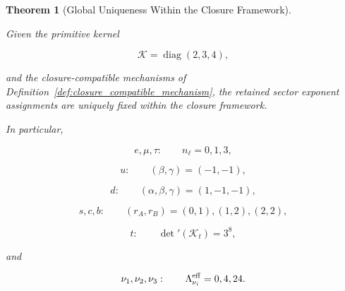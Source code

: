 \documentclass[11pt]{article}
\newtheorem{theorem}{Theorem}[section]
\theoremstyle{definition}
\theoremstyle{remark}
\begin{document}
\begin{theorem}[Global Uniqueness Within the Closure Framework]
\label{thm:global_uniqueness_within_closure_framework}

Given the primitive kernel

\begin{equation}
\mathcal K
=
\operatorname{diag}(2,3,4),
\end{equation}

and the closure-compatible mechanisms of
Definition~\ref{def:closure_compatible_mechanism}, the retained
sector exponent assignments are uniquely fixed within the
closure framework.

In particular,

\begin{equation}
e,\mu,\tau:
\qquad
n_\ell=0,1,3,
\end{equation}

\begin{equation}
u:
\qquad
(\beta,\gamma)=(-1,-1),
\end{equation}

\begin{equation}
d:
\qquad
(\alpha,\beta,\gamma)=(1,-1,-1),
\end{equation}

\begin{equation}
s,c,b:
\qquad
(r_A,r_B)=(0,1),(1,2),(2,2),
\end{equation}

\begin{equation}
t:
\qquad
\det{}'(\mathcal K_t)=3^8,
\end{equation}

and

\begin{equation}
\nu_1,\nu_2,\nu_3:
\qquad
\Lambda_{\nu_i}^{\rm eff}=0,4,24.
\end{equation}

\end{theorem}
\end{document}
